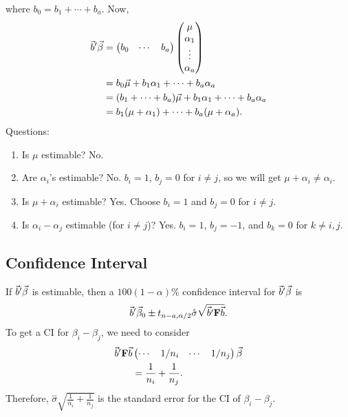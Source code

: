 where $ b_0=b_1+\cdots+b_a $. Now,
\begin{align*}
    \vec{b}'\vec{\beta}
     & =\begin{pmatrix}
            b_0 & \cdots & b_a
        \end{pmatrix}
    \begin{pmatrix}
        \mu      \\
        \alpha_1 \\
        \vdots   \\
        \alpha_a
    \end{pmatrix}                                                  \\
     & =b_0 \vec{\mu}+b_1 \alpha_1+\cdots+b_a \alpha_a           \\
     & =(b_1+\cdots+b_a)\vec{\mu}+b_1\alpha_1+\cdots+b_a\alpha_a \\
     & =b_1(\mu+\alpha_1)+\cdots+b_a(\mu+\alpha_a).
\end{align*}
Questions:
\begin{enumerate}[(1)]
    \item Is $ \mu $ estimable? No.
    \item Are $ \alpha_i $'s estimable? No. $ b_i=1 $, $ b_j=0 $ for $ i\ne j $,
          so we will get $ \mu+\alpha_i\ne \alpha_i $.
    \item Is $ \mu+\alpha_i $ estimable? Yes. Choose $ b_i=1 $ and $ b_j=0 $ for $ i\ne j $.
    \item Is $ \alpha_i-\alpha_j $ estimable (for $ i\ne j $)? Yes. $ b_i=1 $, $ b_j=-1 $, and
          $ b_k=0 $ for $ k\ne i,j $.
\end{enumerate}
\subsection*{Confidence Interval}
If $ \vec{b}'\vec{\beta} $ is estimable, then a $ 100(1-\alpha)\% $
confidence interval for $ \vec{b}'\vec{\beta} $ is
\[ \vec{b}'\vec{\beta}_0\pm t_{n-a,\alpha/2}\hat{\sigma}\sqrt{\vec{b}'\mathbf{F}\vec{b}}. \]
To get a CI for $ \beta_i-\beta_j $, we need to consider
\begin{align*}
    \vec{b}'\mathbf{F}\vec{b}
     & \begin{pmatrix}
           \cdots & 1/n_i & \cdots & 1/n_j
       \end{pmatrix}\vec{\beta} \\
     & =\frac{1}{n_i}+\frac{1}{n_j}.
\end{align*}
Therefore, $ \hat{\sigma}\sqrt{\frac{1}{n_i}+\frac{1}{n_j}} $ is the standard
error for the CI of $ \beta_i-\beta_j $.
